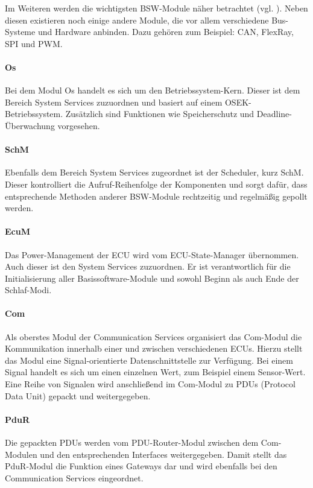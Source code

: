\documentclass[
  a4paper,					    %
  twoside,
  DIV=calc,     				%
  bibliography=totoc,
  cleardoublepage=empty,
  ngerman,     					%
  final       					%
]{scrbook}
\begin{document}
Im Weiteren werden die wichtigsten BSW-Module näher betrachtet (vgl. \cite{SE_Autosar}). Neben diesen existieren noch einige andere Module, die vor allem verschiedene Bus-Systeme und Hardware anbinden. Dazu gehören zum Beispiel: CAN, FlexRay, SPI und PWM.

\paragraph{Os}
Bei dem Modul Os handelt es sich um den Betriebssystem-Kern. Dieser ist dem Bereich System Services zuzuordnen und basiert auf einem OSEK-Betriebssystem. Zusätzlich sind Funktionen wie Speicherschutz und Deadline-Überwachung vorgesehen.

\paragraph{SchM}
Ebenfalls dem Bereich System Services zugeordnet ist der Scheduler, kurz SchM. Dieser kontrolliert die Aufruf-Reihenfolge der Komponenten und sorgt dafür, dass entsprechende Methoden anderer BSW-Module rechtzeitig und regelmäßig gepollt werden.

\paragraph{EcuM}
Das Power-Management der ECU wird vom ECU-State-Manager übernommen. Auch dieser ist den System Services zuzuordnen. Er ist verantwortlich für die Initialisierung aller Basissoftware-Module und sowohl Beginn als auch Ende der Schlaf-Modi.

\paragraph{Com}
Als oberstes Modul der Communication Services organisiert das Com-Modul die Kommunikation innerhalb einer und zwischen verschiedenen ECUs. Hierzu stellt das Modul eine Signal-orientierte Datenschnittstelle zur Verfügung. Bei einem Signal handelt es sich um einen einzelnen Wert, zum Beispiel einem Sensor-Wert. Eine Reihe von Signalen wird anschließend im Com-Modul zu PDUs (Protocol Data Unit) gepackt und weitergegeben.

\paragraph{PduR}
Die gepackten PDUs werden vom PDU-Router-Modul zwischen dem Com-Modulen und den entsprechenden Interfaces weitergegeben. Damit stellt das PduR-Modul die Funktion eines Gateways dar und wird ebenfalls bei den Communication Services eingeordnet.
\end{document}
